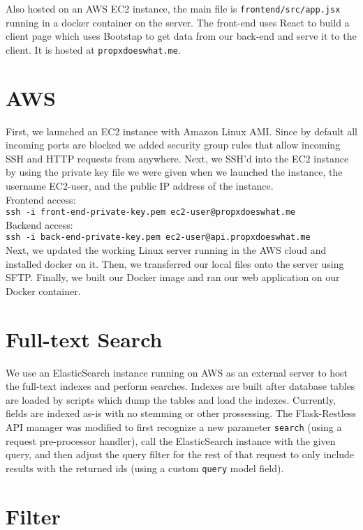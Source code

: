 \documentclass[12pt]{article}
\newcommand{\code}[1]{\texttt{#1}}
\begin{document}
Also hosted on an AWS EC2 instance, the main file is \code{frontend/src/app.jsx} running in a docker container on the server. The front-end uses React to build a client page which uses Bootstap to get data from our back-end and serve it to the client. It is hosted at \code{propxdoeswhat.me}.

\section{AWS}

First, we launched an EC2 instance with Amazon Linux AMI. Since by default all incoming ports are blocked we added security group rules that allow incoming SSH and HTTP requests from anywhere. Next, we SSH'd into the EC2 instance by using the private key file we were given when we launched the instance, the username EC2-user, and the public IP address of the instance. \\

Frontend access: \\
\code{ssh -i front-end-private-key.pem ec2-user@propxdoeswhat.me} \\
Backend access: \\
\code{ssh -i back-end-private-key.pem ec2-user@api.propxdoeswhat.me} \\

Next, we updated the working Linux server running in the AWS cloud and installed docker on it. Then, we transferred our local files onto the server using SFTP. Finally, we built our Docker image and ran our web application on our Docker container.

\section{Full-text Search}

We use an ElasticSearch instance running on AWS as an external server to host the full-text indexes and perform searches. Indexes are built after database tables are loaded by scripts which dump the tables and load the indexes. Currently, fields are indexed as-is with no stemming or other prossessing. The Flask-Restless API manager was modified to first recognize a new parameter \code{search} (using a request pre-processor handler), call the ElasticSearch instance with the given query, and then adjust the query filter for the rest of that request to only include results with the returned ids (using a custom \code{query} model field).

\section{Filter}
\end{document}

